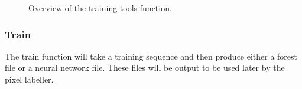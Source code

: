 \documentclass[12pt,twoside,notitlepage]{report}
\begin{document}
\begin{figure}[H]
{\begin{tikzpicture}[node distance=2cm,>=stealth',bend angle=45,auto]
                                    
                            \end{tikzpicture}
                        }

                    \caption{Overview of the training tools function.}
                \end{figure} 



            \subsubsection{Train}
                The train function will take a training sequence and then produce either a forest file or a neural 
                network file. These files will be output to be used later by the pixel labeller.
\end{document}
